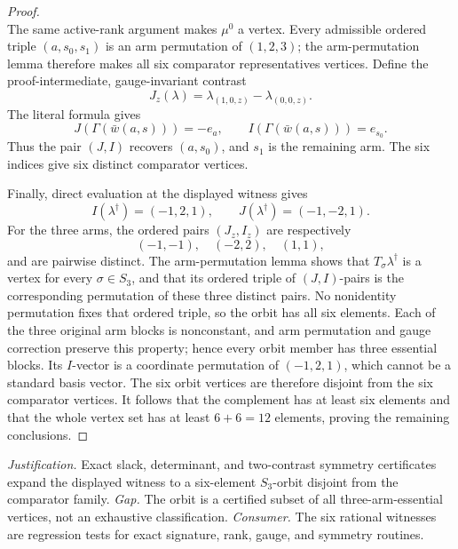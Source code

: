 \documentclass{article}
\begin{document}
\begin{proof}
\[\]
The same active-rank argument makes \(\mu^0\) a vertex. Every admissible ordered triple \((a,s_0,s_1)\) is an arm permutation of \((1,2,3)\); the arm-permutation lemma therefore makes all six comparator representatives vertices. Define the proof-intermediate, gauge-invariant contrast
\[J_z(\lambda)=\lambda_{(1,0,z)}-\lambda_{(0,0,z)}.\]
The literal formula gives
\[J(\Gamma(\bar w(a,s)))=-e_a,\qquad I(\Gamma(\bar w(a,s)))=e_{s_0}.\]
Thus the pair \((J,I)\) recovers \((a,s_0)\), and \(s_1\) is the remaining arm. The six indices give six distinct comparator vertices.

Finally, direct evaluation at the displayed witness gives
\[I(\lambda^\dagger)=(-1,2,1),\qquad J(\lambda^\dagger)=(-1,-2,1).\]
For the three arms, the ordered pairs \((J_z,I_z)\) are respectively
\[(-1,-1),\quad(-2,2),\quad(1,1),\]
and are pairwise distinct. The arm-permutation lemma shows that \(T_\sigma\lambda^\dagger\) is a vertex for every \(\sigma\in S_3\), and that its ordered triple of \((J,I)\)-pairs is the corresponding permutation of these three distinct pairs. No nonidentity permutation fixes that ordered triple, so the orbit has all six elements. Each of the three original arm blocks is nonconstant, and arm permutation and gauge correction preserve this property; hence every orbit member has three essential blocks. Its \(I\)-vector is a coordinate permutation of \((-1,2,1)\), which cannot be a standard basis vector. The six orbit vertices are therefore disjoint from the six comparator vertices. It follows that the complement has at least six elements and that the whole vertex set has at least \(6+6=12\) elements, proving the remaining conclusions.
\end{proof}
\par\smallskip\noindent \textit{Justification.} Exact slack, determinant, and two-contrast symmetry certificates expand the displayed witness to a six-element \(S_3\)-orbit disjoint from the comparator family. \textit{Gap.} The orbit is a certified subset of all three-arm-essential vertices, not an exhaustive classification. \textit{Consumer.} The six rational witnesses are regression tests for exact signature, rank, gauge, and symmetry routines.
\end{document}
